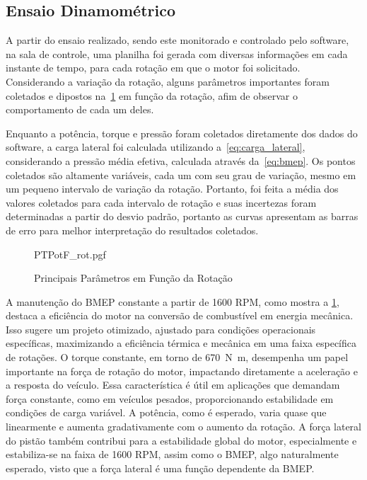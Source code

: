\subsection{Ensaio Dinamométrico}

A partir do ensaio realizado, sendo este monitorado e controlado pelo software, na sala de controle, uma planilha foi gerada com diversas informações em cada instante de tempo, para cada rotação em que o motor foi solicitado.
Considerando a variação da rotação, alguns parâmetros importantes foram coletados e dipostos na~\cref{fig:PTPotF_rot} em função da rotação, afim de observar o comportamento de cada um deles.

Enquanto a potência, torque e pressão foram coletados diretamente dos dados do software, a carga lateral foi calculada utilizando a~\cref{eq:carga_lateral},  considerando a pressão média efetiva, calculada através da~\cref{eq:bmep}.
Os pontos coletados são altamente variáveis, cada um com seu grau de variação, mesmo em um pequeno intervalo de variação da rotação. 
Portanto, foi feita a média dos valores coletados para cada intervalo de rotação e suas incertezas foram determinadas a partir do desvio padrão, portanto as curvas apresentam as barras de erro para melhor interpretação do resultados coletados.
%
\begin{figure}[!htb]
    \centering
    \caption{Principais Parâmetros em Função da Rotação}
    {PTPotF_rot.pgf}
    \label{fig:PTPotF_rot}
\end{figure}
%
A manutenção do BMEP constante a partir de 1600 RPM, como mostra a \cref{fig:PTPotF_rot}, destaca a eficiência do motor na conversão de combustível em energia mecânica. 
Isso sugere um projeto otimizado, ajustado para condições operacionais específicas, maximizando a eficiência térmica e mecânica em uma faixa específica de rotações.
O torque constante, em torno de \SI{670}{N.m}, desempenha um papel importante na força de rotação do motor, impactando diretamente a aceleração e a resposta do veículo. Essa característica é útil em aplicações que demandam força constante, como em veículos pesados, proporcionando estabilidade em condições de carga variável.
A potência, como é esperado, varia quase que linearmente e aumenta gradativamente com o aumento da rotação.
A força lateral do pistão também contribui para a estabilidade global do motor, especialmente e estabiliza-se na faixa de 1600 RPM, assim como o BMEP, algo naturalmente esperado, visto que a força lateral é uma função dependente da BMEP.

